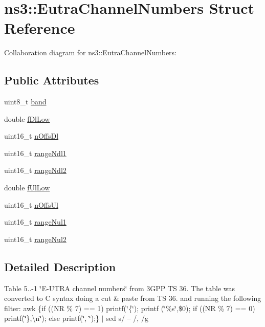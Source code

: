 \hypertarget{structns3_1_1EutraChannelNumbers}{}\section{ns3\+:\+:Eutra\+Channel\+Numbers Struct Reference}
\label{structns3_1_1EutraChannelNumbers}


Collaboration diagram for ns3\+:\+:Eutra\+Channel\+Numbers\+:
\subsection*{Public Attributes}
\begin{DoxyCompactItemize}
\item 
uint8\+\_\+t \hyperlink{structns3_1_1EutraChannelNumbers_a2e411dcc3b8f3bf33f2de471121a4764}{band}
\item 
double \hyperlink{structns3_1_1EutraChannelNumbers_a6604ca119e13ce324756a7f2e438137f}{f\+Dl\+Low}
\item 
uint16\+\_\+t \hyperlink{structns3_1_1EutraChannelNumbers_aae2b0869705effdf899566a098d9fd97}{n\+Offs\+Dl}
\item 
uint16\+\_\+t \hyperlink{structns3_1_1EutraChannelNumbers_a118be263403d5513d7838556d9f206ef}{range\+Ndl1}
\item 
uint16\+\_\+t \hyperlink{structns3_1_1EutraChannelNumbers_a4f4c7a12827ad95119bb2057eb1f15fc}{range\+Ndl2}
\item 
double \hyperlink{structns3_1_1EutraChannelNumbers_ac399b8ddb10beb25d52f8477b174b5fb}{f\+Ul\+Low}
\item 
uint16\+\_\+t \hyperlink{structns3_1_1EutraChannelNumbers_a9698201d767bf192e59a9a97cd1260be}{n\+Offs\+Ul}
\item 
uint16\+\_\+t \hyperlink{structns3_1_1EutraChannelNumbers_ad79caebe14b50dde94a39c53c47ec271}{range\+Nul1}
\item 
uint16\+\_\+t \hyperlink{structns3_1_1EutraChannelNumbers_ad03939a99cbce8ad704dc575e8e2db3c}{range\+Nul2}
\end{DoxyCompactItemize}


\subsection{Detailed Description}
Table 5..-\/1 \char`\"{}\+E-\/\+U\+T\+R\+A channel numbers\char`\"{} from 3\+G\+PP TS 36. The table was converted to C syntax doing a cut \& paste from TS 36. and running the following filter\+: awk \textquotesingle{}\{if ((NR \% 7) == 1) printf(\char`\"{}\{\char`\"{}); printf (\char`\"{}\%s\char`\"{},\$0); if ((NR \% 7) == 0) printf(\char`\"{}\},\textbackslash{}n\char`\"{}); else printf(\char`\"{}, \char`\"{});\}\textquotesingle{} $\vert$ sed \textquotesingle{}s/ – /, /g\textquotesingle{} 


